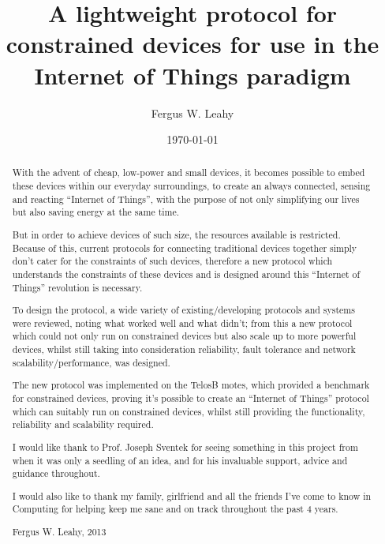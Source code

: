 \documentclass{l4proj}
\begin{document}
\title{A lightweight protocol for constrained devices for use in the Internet of Things paradigm}
\author{Fergus W. Leahy}
\date{\today}
\maketitle

\begin{abstract}
With the advent of cheap, low-power and small devices, it becomes possible to embed these devices within our everyday surroundings, to create an always connected, sensing and reacting ``Internet of Things'', with the purpose of not only simplifying our lives but also saving energy at the same time. 

But in order to achieve devices of such size, the resources available is restricted. Because of this, current protocols for connecting traditional devices together simply don't cater for the constraints of such devices, therefore a new protocol which understands the constraints of these devices and is designed around this ``Internet of Things'' revolution is necessary.

To design the protocol, a wide variety of existing/developing protocols and systems were reviewed, noting what worked well and what didn't; from this a new protocol which could not only run on constrained devices but also scale up to more powerful devices, whilst still taking into consideration reliability, fault tolerance and network scalability/performance, was designed.

The new protocol was implemented on the TelosB motes, which provided a benchmark for constrained devices, proving it's possible to create an ``Internet of Things'' protocol which can suitably run on constrained devices, whilst still providing the functionality, reliability and scalability required. 

\end{abstract}

\renewcommand{\abstractname}{Acknowledgements}
\begin{abstract}
I would like thank to Prof. Joseph Sventek for seeing something in this project from when it was only a seedling of an idea, and for his invaluable support, advice and guidance throughout.

\noindent I would also like to thank my family, girlfriend and all the friends I've come to know in Computing for helping keep me sane and on track throughout the past 4 years.

Fergus W. Leahy, 2013
\end{abstract}
\educationalconsent
%
%
\tableofcontents
\end{document}
